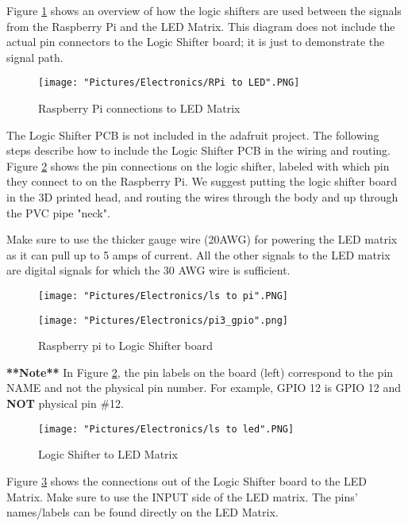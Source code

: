 \documentclass[12pt]{article}
\begin{document}
\noindent Figure \ref{rpi2led} shows an overview of how the logic shifters are used between the signals from the Raspberry Pi and the LED Matrix. This diagram does not include the actual pin connectors to the Logic Shifter board; it is just to demonstrate the signal path.

\begin{figure}[H]
 	\centering
	\texttt{[image: "Pictures/Electronics/RPi to LED".PNG]}
 	\caption{Raspberry Pi connections to LED Matrix}
	\label{rpi2led}
\end{figure}


\noindent The Logic Shifter PCB is not included in the adafruit project. The following steps describe how to include the Logic Shifter PCB in the wiring and routing. Figure \ref{ls2pi} shows the pin connections on the logic shifter, labeled with which pin they connect to on the Raspberry Pi. We suggest putting the logic shifter board in the 3D printed head, and routing the wires through the body and up through the PVC pipe "neck". 

\noindent Make sure to use the thicker gauge wire (20AWG) for powering the LED matrix as it can pull up to 5 amps of current. All the other signals to the LED matrix are digital signals for which the 30 AWG wire is sufficient. 

\begin{figure}[H]
 	\centering
  	\begin{minipage}[b]{0.45\textwidth}
		\texttt{[image: "Pictures/Electronics/ls to pi".PNG]}
  	\end{minipage}
  	\hfill
  	\begin{minipage}[b]{0.45\textwidth}
    		\texttt{[image: "Pictures/Electronics/pi3\_gpio".png]}
  	\end{minipage}
	\caption{Raspberry pi to Logic Shifter board}
	\label{ls2pi}
\end{figure}

\textbf{**Note**} In Figure \ref{ls2pi}, the pin labels on the board (left) correspond to the pin NAME and not the physical pin number. For example, GPIO 12 is GPIO 12 and \textbf{NOT} physical pin \#12.

\begin{figure}[H]
 	\centering
	\texttt{[image: "Pictures/Electronics/ls to led".PNG]}
 	\caption{Logic Shifter to LED Matrix}
	\label{ls2led}
\end{figure}

Figure \ref{ls2led} shows the connections out of the Logic Shifter board to the LED Matrix. Make sure to use the INPUT side of the LED matrix. The pins' names/labels can be found directly on the LED Matrix.  
\end{document}

